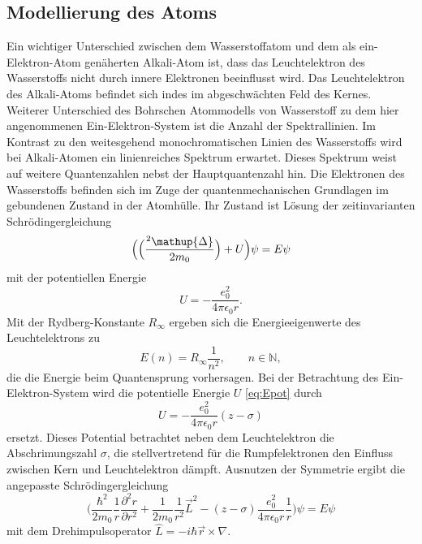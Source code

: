 \subsection{Modellierung des Atoms} %
\label{sub:L_quantenzahl}
Ein wichtiger Unterschied zwischen dem Wasserstoffatom und dem als ein-Elektron-Atom genäherten Alkali-Atom ist, dass das Leuchtelektron des Wasserstoffs nicht durch innere Elektronen beeinflusst wird.
Das Leuchtelektron des Alkali-Atoms befindet sich indes im abgeschwächten Feld des Kernes.
Weiterer Unterschied des Bohrschen Atommodells von Wasserstoff zu dem hier angenommenen Ein-Elektron-System ist die Anzahl der Spektrallinien. 
Im Kontrast zu den weitesgehend monochromatischen Linien des Wasserstoffs wird bei Alkali-Atomen ein linienreiches Spektrum erwartet.
Dieses Spektrum weist auf weitere Quantenzahlen nebst der Hauptquantenzahl hin.
Die Elektronen des Wasserstoffs befinden sich im Zuge der quantenmechanischen Grundlagen im gebundenen Zustand in der Atomhülle.
Ihr Zustand ist Lösung der zeitinvarianten Schrödingergleichung
\begin{equation}
	\Bigl(\Bigl(\frac{\hbar^2\mathup{\Delta}}{2 m_0}\Bigr)+U\Bigr)\psi=E\psi
	\label{eq:schroedinger}
\end{equation}
mit der potentiellen Energie 
\begin{equation}
	U=-\frac{e_0^2}{4\pi\epsilon_0 r}.
	\label{eq:Epot}
\end{equation}
Mit der Rydberg-Konstante $R_\infty$ ergeben sich die Energieeigenwerte des Leuchtelektrons zu
\begin{equation}
	E(n)=R_\infty\frac{1}{n^2}, \qquad n\in\mathbb{N},
	\label{eq:EEW}
\end{equation}
die die Energie beim Quantensprung vorhersagen.
Bei der Betrachtung des Ein-Elektron-System wird die potentielle Energie $U$ \eqref{eq:Epot} durch
\begin{equation}
	U=-\frac{e_0^2}{4\pi\epsilon_0 r}(z-\sigma)
	\label{eq:Epot_neu}
\end{equation}
ersetzt.
Dieses Potential betrachtet neben dem Leuchtelektron die Abschrimungszahl $\sigma$, die stellvertretend für die Rumpfelektronen den Einfluss zwischen Kern und Leuchtelektron dämpft.
Ausnutzen der Symmetrie ergibt die angepasste Schrödingergleichung
\begin{equation}
	\biggl(\frac{\hbar^2}{2m_0}\frac{1}{r}\frac{\partial^2 r}{\partial r^2}+\frac{1}{2m_0}\frac{1}{r^2} \vec{L}^2-(z-\sigma)\frac{e_0^2}{4\pi\epsilon_0 r}\frac{1}{r}\biggr)\psi=E\psi
	\label{eq:schroedinger_2}
\end{equation}
mit dem Drehimpulsoperator $\hat{L}=-i\hbar \vec{r}\times\nabla$.

